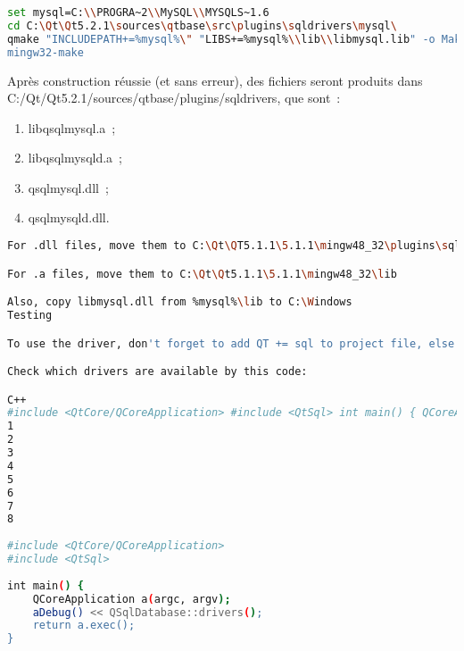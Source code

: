 
\begin{lstlisting}[language=Bash, escapechar=$]
set mysql=C:\\PROGRA~2\\MySQL\\MYSQLS~1.6
cd C:\Qt\Qt5.2.1\sources\qtbase\src\plugins\sqldrivers\mysql\
qmake "INCLUDEPATH+=%mysql%\" "LIBS+=%mysql%\\lib\\libmysql.lib" -o Makefile mysql.pro
mingw32-make
\end{lstlisting}
Après construction réussie (et sans erreur), des fichiers seront produits dans C:/Qt/Qt5.2.1/sources/qtbase/plugins/sqldrivers, que sont~:
\begin{enumerate}
	\item libqsqlmysql.a~;
	\item libqsqlmysqld.a~;
	\item qsqlmysql.dll~;
	\item qsqlmysqld.dll.
\end{enumerate}
\begin{lstlisting}[language=Bash, escapechar=$]
For .dll files, move them to C:\Qt\QT5.1.1\5.1.1\mingw48_32\plugins\sqldrivers.

For .a files, move them to C:\Qt\Qt5.1.1\5.1.1\mingw48_32\lib

Also, copy libmysql.dll from %mysql%\lib to C:\Windows
Testing

To use the driver, don't forget to add QT += sql to project file, else it don't work.

Check which drivers are available by this code:

C++
#include <QtCore/QCoreApplication> #include <QtSql> int main() { QCoreApplication a(argc, argv); aDebug() << QSqlDatabase::drivers(); return a.exec(); }
1
2
3
4
5
6
7
8
	
#include <QtCore/QCoreApplication>
#include <QtSql>
 
int main() {
    QCoreApplication a(argc, argv);
    aDebug() << QSqlDatabase::drivers();
    return a.exec();
}

\end{lstlisting}
